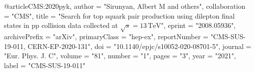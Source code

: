 @article{CMS:2020pyk,
    author = "Sirunyan, Albert M and others",
    collaboration = "CMS",
    title = "{Search for top squark pair production using dilepton final states in ${\text {p}}{\text {p}}$ collision data collected at $\sqrt{s}=13\,\text {TeV} $}",
    eprint = "2008.05936",
    archivePrefix = "arXiv",
    primaryClass = "hep-ex",
    reportNumber = "CMS-SUS-19-011, CERN-EP-2020-131",
    doi = "10.1140/epjc/s10052-020-08701-5",
    journal = "Eur. Phys. J. C",
    volume = "81",
    number = "1",
    pages = "3",
    year = "2021",
    label = "CMS-SUS-19-011"
}

